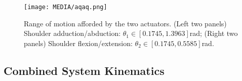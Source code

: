 \documentclass[letterpaper, 10pt, conference]{ieeeconf}      %
\begin{document}


\begin{figure}[!t]
\vspace{6pt}
\texttt{[image: MEDIA/aqaq.png]}
\vspace{-18pt}
\caption{Range of motion afforded by the two actuators. (Left two panels) Shoulder adduction/abduction: $\theta_1\in[0.1745,1.3963]$\;rad; (Right two panels) Shoulder flexion/extension: $\theta_2\in[0.1745,0.5585]$\;rad.}
\label{fig:bellow}
\vspace{-6pt}
\end{figure}









\subsection{Combined System Kinematics}
\end{document}
